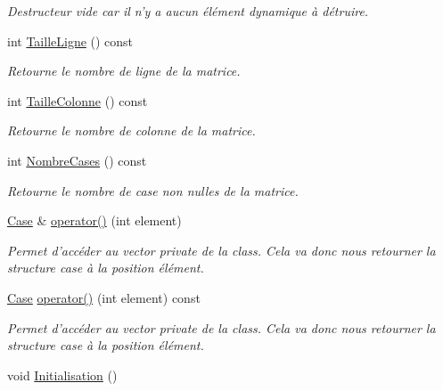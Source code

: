 \begin{DoxyCompactItemize}
\begin{DoxyCompactList}\small\item\em Destructeur vide car il n'y a aucun élément dynamique à détruire. \end{DoxyCompactList}\item 
int \hyperlink{classMatrice_a4aea33f47f5eaa578d529c39380c1202}{Taille\-Ligne} () const 
\begin{DoxyCompactList}\small\item\em Retourne le nombre de ligne de la matrice. \end{DoxyCompactList}\item 
int \hyperlink{classMatrice_a145d6c61a681d0d7727a26304a598363}{Taille\-Colonne} () const 
\begin{DoxyCompactList}\small\item\em Retourne le nombre de colonne de la matrice. \end{DoxyCompactList}\item 
int \hyperlink{classMatrice_afaec928a8d0d021441b243f80ca9fcfc}{Nombre\-Cases} () const 
\begin{DoxyCompactList}\small\item\em Retourne le nombre de case non nulles de la matrice. \end{DoxyCompactList}\item 
\hyperlink{structCase}{Case} \& \hyperlink{classMatrice_a9296005ce933f25059fc65b88261bbef}{operator()} (int element)
\begin{DoxyCompactList}\small\item\em Permet d'accéder au vector private de la class. Cela va donc nous retourner la structure case à la position élément. \end{DoxyCompactList}\item 
\hyperlink{structCase}{Case} \hyperlink{classMatrice_af2c2f32b3d8199af19dfbf296d54b6c7}{operator()} (int element) const 
\begin{DoxyCompactList}\small\item\em Permet d'accéder au vector private de la class. Cela va donc nous retourner la structure case à la position élément. \end{DoxyCompactList}\item 
\hypertarget{classMatrice_af2e5ed60f4d4ccbbc16140fa4e4d0ef0}{void \hyperlink{classMatrice_af2e5ed60f4d4ccbbc16140fa4e4d0ef0}{Initialisation} ()}\label{classMatrice_af2e5ed60f4d4ccbbc16140fa4e4d0ef0}


\end{DoxyCompactItemize}
